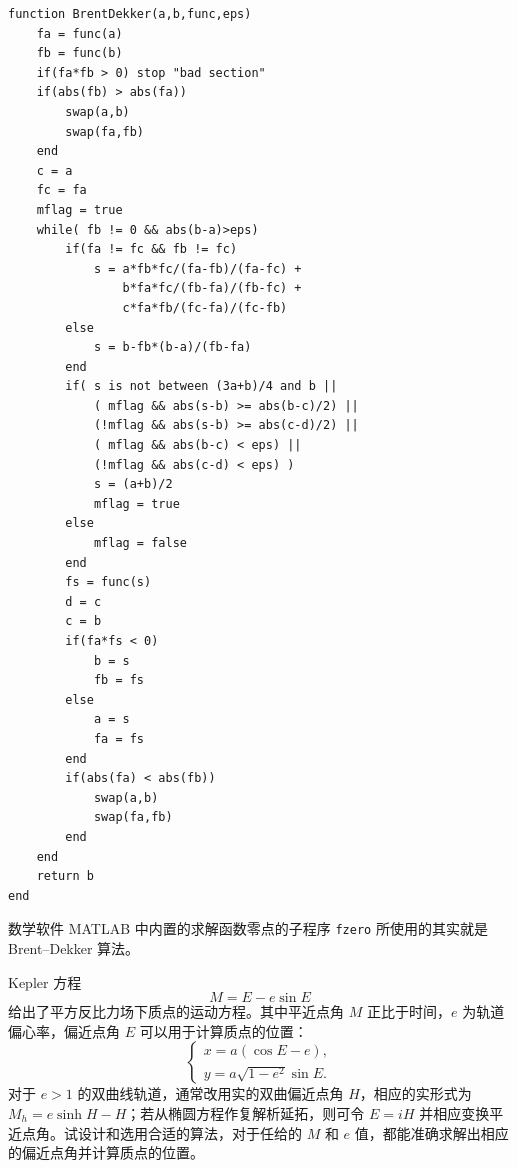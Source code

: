 \begin{algorithmBox}
\begin{lstlisting}[style=bellacode]
function BrentDekker(a,b,func,eps)
    fa = func(a)
    fb = func(b)
    if(fa*fb > 0) stop "bad section"
    if(abs(fb) > abs(fa))
        swap(a,b)
        swap(fa,fb)
    end
    c = a
    fc = fa
    mflag = true
    while( fb != 0 && abs(b-a)>eps)
        if(fa != fc && fb != fc)
            s = a*fb*fc/(fa-fb)/(fa-fc) +
                b*fa*fc/(fb-fa)/(fb-fc) +
                c*fa*fb/(fc-fa)/(fc-fb)
        else
            s = b-fb*(b-a)/(fb-fa)
        end
        if( s is not between (3a+b)/4 and b ||
            ( mflag && abs(s-b) >= abs(b-c)/2) ||
            (!mflag && abs(s-b) >= abs(c-d)/2) ||
            ( mflag && abs(b-c) < eps) ||
            (!mflag && abs(c-d) < eps) )
            s = (a+b)/2
            mflag = true
        else
            mflag = false
        end
        fs = func(s)
        d = c
        c = b
        if(fa*fs < 0)
            b = s
            fb = fs
        else
            a = s
            fa = fs
        end
        if(abs(fa) < abs(fb))
            swap(a,b)
            swap(fa,fb)
        end
    end
    return b
end
\end{lstlisting}
\end{algorithmBox}

数学软件 MATLAB 中内置的求解函数零点的子程序 \texttt{fzero} 所使用的其实就是 Brent--Dekker 算法。

\begin{exerciseBox}[练习 2.3]
Kepler 方程
\[
M=E-e\sin E
\]
给出了平方反比力场下质点的运动方程。其中平近点角 $M$ 正比于时间，$e$ 为轨道偏心率，偏近点角 $E$ 可以用于计算质点的位置：
\[
\begin{cases}
x=a(\cos E-e),\\
y=a\sqrt{1-e^2}\sin E.
\end{cases}
\]
对于 $e>1$ 的双曲线轨道，通常改用实的双曲偏近点角 $H$，相应的实形式为 $M_h=e\sinh H-H$；若从椭圆方程作复解析延拓，则可令 $E=iH$ 并相应变换平近点角。试设计和选用合适的算法，对于任给的 $M$ 和 $e$ 值，都能准确求解出相应的偏近点角并计算质点的位置。
\end{exerciseBox}

